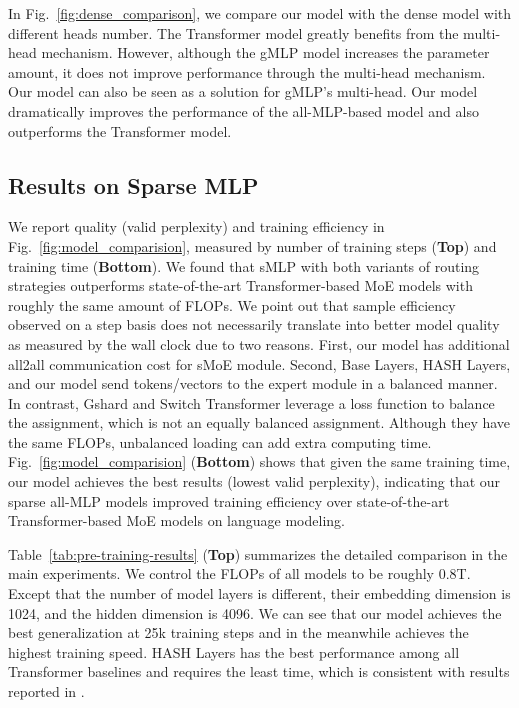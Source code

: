 \documentclass{article}
\begin{document}
 



In Fig.~\ref{fig:dense_comparison}, we compare our model with the dense model with different heads number. The Transformer model greatly benefits from the multi-head mechanism. However, although the gMLP model increases the parameter amount, it does not improve performance through the multi-head mechanism. Our model can also be seen as a solution for gMLP's multi-head. Our model dramatically improves the performance of the all-MLP-based model and also outperforms the Transformer model. 



\vspace{-2mm}
\subsection{Results on Sparse MLP}
\label{sec:small_model_results}

We report quality (valid perplexity) and training efficiency in Fig.~\ref{fig:model_comparision}, measured by number of training steps (\textbf{Top}) and training time (\textbf{Bottom}). We found that sMLP with both variants of routing strategies outperforms state-of-the-art Transformer-based MoE models with roughly the same amount of FLOPs. We point out that sample efficiency observed on a step basis does not necessarily translate into better model quality as measured by the wall clock due to two reasons. 
First, our model has additional all2all communication cost for sMoE module. Second, Base Layers, HASH Layers, and our model send tokens/vectors to the expert module in a balanced manner. In contrast, Gshard and Switch Transformer leverage a loss function to balance the assignment, which is not an equally balanced assignment. Although they have the same FLOPs, unbalanced loading can add extra computing time.
Fig.~\ref{fig:model_comparision} (\textbf{Bottom}) shows that given the same training time, our model achieves the best results (lowest valid perplexity), indicating that our sparse all-MLP models improved training efficiency over state-of-the-art Transformer-based MoE models on language modeling. 

Table~\ref{tab:pre-training-results} (\textbf{Top}) summarizes the detailed comparison in the main experiments. We control the FLOPs of all models to be roughly 0.8T. Except that the number of model layers is different, their embedding dimension is 1024, and the hidden dimension is 4096. We can see that our model achieves the best generalization at 25k training steps and in the meanwhile achieves the highest training speed. HASH Layers has the best performance among all Transformer baselines and requires the least time, which is consistent with results reported in \citet{hashlayer}.
\end{document}
